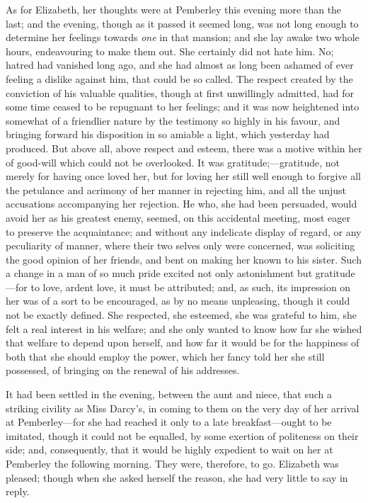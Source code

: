 \documentclass[12pt,openright]{book}
\begin{document}
As for Elizabeth, her thoughts were at Pemberley this evening more than the last; and the evening, though as it passed it seemed long, was not long enough to determine her feelings towards \textit{one} in that mansion; and she lay awake two whole hours, endeavouring to make them out. She certainly did not hate him. No; hatred had vanished long ago, and she had almost as long been ashamed of ever feeling a dislike against him, that could be so called. The respect created by the conviction of his valuable qualities, though at first unwillingly admitted, had for some time ceased to be repugnant to her feelings; and it was now heightened into somewhat of a friendlier nature by the testimony so highly in his favour, and bringing forward his disposition in so amiable a light, which yesterday had produced. But above all, above respect and esteem, there was a motive within her of good-will which could not be overlooked. It was gratitude;—gratitude, not merely for having once loved her, but for loving her still well enough to forgive all the petulance and acrimony of her manner in rejecting him, and all the unjust accusations accompanying her rejection. He who, she had been persuaded, would avoid her as his greatest enemy, seemed, on this accidental meeting, most eager to preserve the acquaintance; and without any indelicate display of regard, or any peculiarity of manner, where their two selves only were concerned, was soliciting the good opinion of her friends, and bent on making her known to his sister. Such a change in a man of so much pride excited not only astonishment but gratitude—for to love, ardent love, it must be attributed; and, as such, its impression on her was of a sort to be encouraged, as by no means unpleasing, though it could not be exactly defined. She respected, she esteemed, she was grateful to him, she felt a real interest in his welfare; and she only wanted to know how far she wished that welfare to depend upon herself, and how far it would be for the happiness of both that she should employ the power, which her fancy told her she still possessed, of bringing on the renewal of his addresses.

It had been settled in the evening, between the aunt and niece, that such a striking civility as Miss Darcy’s, in coming to them on the very day of her arrival at Pemberley—for she had reached it only to a late breakfast—ought to be imitated, though it could not be equalled, by some exertion of politeness on their side; and, consequently, that it would be highly expedient to wait on her at Pemberley the following morning. They were, therefore, to go. Elizabeth was pleased; though when she asked herself the reason, she had very little to say in reply.
\end{document}
